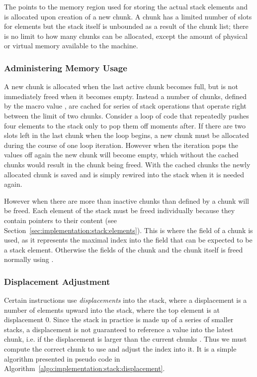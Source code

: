 The  points to the memory region used for storing the
actual stack elements and is allocated upon creation of a new chunk. A
chunk has a limited number of slots for elements but the stack itself
is unbounded as a result of the chunk list; there is no limit to how
many chunks can be allocated, except the amount of physical or virtual
memory available to the machine.

\subsubsection{Administering Memory Usage}

A new chunk is allocated when the last active chunk becomes full, but
is not immediately freed when it becomes empty. Instead a number of
chunks, defined by the macro value
, are cached for series of stack
operations that operate right between the limit of two
chunks. Consider a loop of code that repeatedly pushes four elements
to the stack only to pop them off moments after. If there are two
slots left in the last chunk when the loop begins, a new chunk must be
allocated during the course of one loop iteration. However when the
iteration pops the values off again the new chunk will become empty,
which without the cached chunks would result in the chunk being
freed. With the cached chunks the newly allocated chunk is saved and
is simply rewired into the stack when it is needed again.

However when there are more than inactive chunks than defined by
 a chunk will be freed. Each
element of the stack must be freed individually because they contain
pointers to their content (see
Section~\ref{sec:implementation:stack:elements}). This is where the
 field of a chunk is used, as it represents the maximal
index into the  field that can be expected to be a
stack element. Otherwise the fields of the chunk and the chunk itself
is freed normally using .

\subsubsection{Displacement Adjustment}

Certain instructions use \textit{displacements} into the stack, where
a displacement is a number of elements upward into the stack, where
the top element is at displacement 0. Since the stack in practice is
made up of a series of smaller stacks, a displacement is not
guaranteed to reference a value into the latest chunk, i.e. if the
displacement is larger than the current chunks . Thus we
must compute the correct chunk to use and adjust the index into it. It
is a simple algorithm presented in pseudo code in
Algorithm~\ref{algo:implementation:stack:displacement}.

